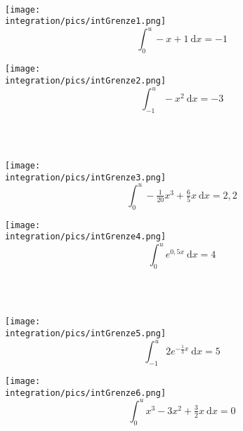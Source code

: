 \documentclass[a4paper,12pt, headsepline, ngerman]{scrartcl}
\theoremstyle{definition}
\newcommand{\td}{\ \text{d}}
\begin{document}
\begin{Exercise}[title={\raggedright\normalfont Schätze jeweils ein \(u\) graphisch ab und berechne dann die Lösung. Das gesuchte \(u\) soll immer größer als die untere Grenze sein:}, label=intGrenzeA1]\\
\begin{minipage}{\textwidth}
	\begin{minipage}{.5\textwidth}\raggedright
		\texttt{[image: \\integration/pics/intGrenze1.png]}
		\[\int_0^u-x+1 \td x=-1\]
	\end{minipage}
	\begin{minipage}{.5\textwidth}
		\texttt{[image: \\integration/pics/intGrenze2.png]}
		\[\int_{-1}^u-x^2 \td x=-3\]
	\end{minipage}\vspace{\baselineskip}\\\vspace{\baselineskip}\\
	\begin{minipage}{.5\textwidth}\raggedright
		\texttt{[image: \\integration/pics/intGrenze3.png]}
		\[\int_0^u-\tfrac{1}{20}x^3+\tfrac{6}{5}x \td x=2,2\]
	\end{minipage}
	\begin{minipage}{.5\textwidth}
		\texttt{[image: \\integration/pics/intGrenze4.png]}
		\[\int_0^u e^{0,5x} \td x=4\]
	\end{minipage}\vspace{\baselineskip}\\\vspace{\baselineskip}\\
	\begin{minipage}{.5\textwidth}\raggedright
		\texttt{[image: \\integration/pics/intGrenze5.png]}
		\[\int_{-1}^u 2e^{-\tfrac{1}{3}x} \td x=5\]
	\end{minipage}
	\begin{minipage}{.5\textwidth}
		\texttt{[image: \\integration/pics/intGrenze6.png]}
		\[\int_0^u x^3-3x^2+\tfrac{3}{2}x \td x=0\]
	\end{minipage}
\end{minipage}
\end{Exercise}
\end{document}
